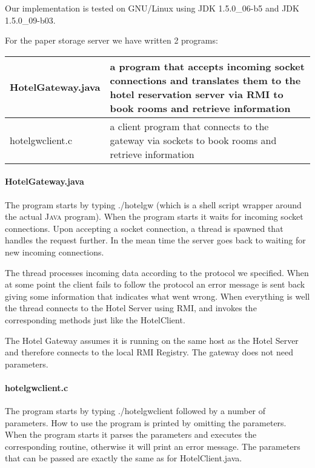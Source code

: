 \documentclass[a4paper,10pt]{article}
\begin{document}
Our implementation is tested on GNU/Linux using JDK 1.5.0\_06-b5 and JDK 1.5.0\_09-b03.

For the paper storage server we have written 2 programs:
\begin{center}
\begin{tabular}{ l | p{8.2cm} }
HotelGateway.java & a program that accepts incoming socket connections and translates them to the hotel reservation server via RMI to book rooms and retrieve information\\ \hline
hotelgwclient.c & a client program that connects to the gateway via sockets to book rooms and retrieve information\\
\end{tabular}
\end{center}

\paragraph{HotelGateway.java}
The program starts by typing ./hotelgw (which is a shell script wrapper around the actual \textsc{Java} program). When the program starts it waits for incoming socket connections. Upon accepting a socket connection, a thread is spawned that handles the request further. In the mean time the server goes back to waiting for new incoming connections.

The thread processes incoming data according to the protocol we specified. When at some point the client fails to follow the protocol an error message is sent back giving some information that indicates what went wrong. When everything is well the thread connects to the Hotel Server using RMI, and invokes the corresponding methods just like the HotelClient.

The Hotel Gateway assumes it is running on the same host as the Hotel Server and therefore connects to the local RMI Registry. The gateway does not need parameters.

\paragraph{hotelgwclient.c}
The program starts by typing ./hotelgwclient followed by a number of parameters. How to use the program is printed by omitting the parameters. When the program starts it parses the parameters and executes the corresponding routine, otherwise it will print an error message. The parameters that can be passed are exactly the same as for HotelClient.java.
\end{document}
